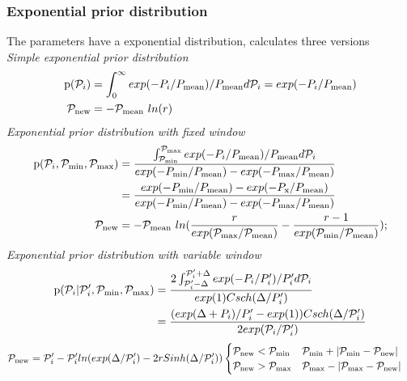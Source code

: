 \subsubsection{Exponential prior distribution}
The parameters have a exponential distribution, \migrate calculates three versions\\
\textsl{Simple exponential prior distribution}
\begin{align}
\label{EXPPRIOR}
    \prob(\P_i) &=  \int_0^\infty exp( -P_{i} / P_{\rm mean}) / P_{\rm mean} d\P_i = exp(- P_{i}/P_{\rm mean}) \\
    \P_{\rm new} &=  - \P_{\rm mean}\ ln(r)
\end{align}
\textsl{Exponential prior distribution with fixed window}
\begin{align}
\label{WEXPPRIOR}
    \prob(\P_i, \P_{\rm min}, \P_{\rm max}) &=  \frac{\int_{\P_{\rm min}}^{\P_{\rm max}} exp( -P_{i} / P_{\rm mean}) / P_{\rm mean} d\P_i}{exp(-P_{\rm min}/P_{\rm mean}) - exp(-P_{\rm max}/P_{\rm mean})}\\ 
     &= \frac{exp(-P_{\rm min}/P_{\rm mean}) - exp(-P_{\rm x}/P_{\rm mean})}{exp(-P_{\rm min}/P_{\rm mean}) - exp(-P_{\rm max}/P_{\rm mean})} \\
    \P_{\rm new} &=  - \P_{\rm mean}\ ln(\frac{r}{exp(\P_{\rm max}/\P_{\rm mean})}-\frac{r-1}{exp(\P_{\rm min}/\P_{\rm mean})}); 
\end{align}
\textsl{Exponential prior distribution with variable window}
\begin{align}
\label{AEXPPRIOR}
    \prob(\P_i | \P'_i,  \P_{\rm min}, \P_{\rm max}) &=  \frac{2 \int_{\P'_i - \Delta}^{\P'_i + \Delta} exp( -P_{i} / P'_i) / P'_i d\P_i}{exp(1) Csch(\Delta / P'_i)}\\ 
     &= \frac{(exp(\Delta + P_i)/P'_i - exp(1)) Csch(\Delta/\P'_i)}{2 exp(\P_i/\P'_i)} 
     \end{align}
     \begin{align}
    \P_{\rm new} &=  \P'_i - \P'_i ln(exp(\Delta/\P'_i) - 2 r Sinh(\Delta / \P'_i))\begin{cases} \P_{\rm new} < \P_{\rm min}  &  \P_{\rm min} + |\P_{\rm min} - \P_{\rm new}| \\
     \P_{\rm new} > \P_{\rm max}  &  \P_{\rm max} - |\P_{\rm max} - \P_{\rm new}| \end{cases}
\end{align}
